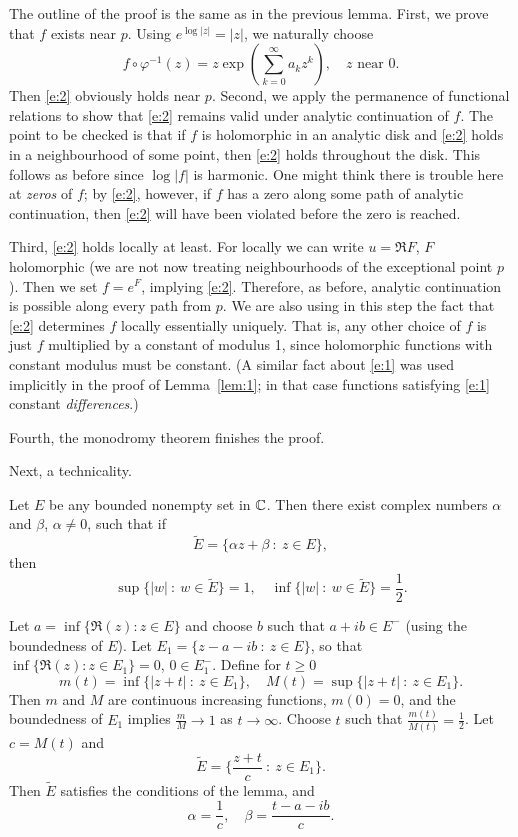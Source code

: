 \documentclass[a4paper,11pt]{article}
\begin{document}
\begin{myproof}
  The outline of the proof is the same as in the previous lemma.
  First, we prove that $f$ exists near $p$.  Using $e^{\log|z|} =
  |z|$, we naturally choose
  $$
  f \circ \varphi^{-1}(z) = z \exp(\sum_{k=0}^{\infty} a_k z^k),
  \quad z\text{ near } 0.
  $$
  Then \eqref{e:2} obviously holds near $p$.  Second, we apply the
  permanence of functional relations to show that \eqref{e:2} remains
  valid under analytic continuation of $f$.  The point to be checked
  is that if $f$ is holomorphic in an analytic disk and \eqref{e:2}
  holds in a neighbourhood of some point, then \eqref{e:2} holds
  throughout the disk.  This follows as before since $\log|f|$ is
  harmonic.  One might think there is trouble here at \emph{zeros} of
  $f$; by \eqref{e:2}, however, if $f$ has a zero along some path of
  analytic continuation, then \eqref{e:2} will have been violated
  before the zero is reached.

  Third, \eqref{e:2} holds locally at least.  For locally we can write
  $u = \Re F$, $F$ holomorphic (we are not now treating neighbourhoods
  of the exceptional point $p$).  Then we set $f = e^F$, implying
  \eqref{e:2}.  Therefore, as before, analytic continuation is
  possible along every path from $p$.  We are also using in this step
  the fact that \eqref{e:2} determines $f$ locally essentially
  uniquely.  That is, any other choice of $f$ is just $f$ multiplied
  by a constant of modulus 1, since holomorphic functions with
  constant modulus must be constant.  (A similar fact about
  \eqref{e:1} was used implicitly in the proof of Lemma~\ref{lem:1};
  in that case functions satisfying \eqref{e:1} constant
  \emph{differences}.)

  Fourth, the monodromy theorem finishes the proof.
\end{myproof}

Next, a technicality.
\begin{lem}
  \label{lem:3}
  Let $E$ be any bounded nonempty set in ${\mathbb C}$.  Then there exist
  complex numbers $\alpha$ and $\beta$, $\alpha \ne 0$, such that if
  $$
  \widetilde{E} = \{\alpha z + \beta ~:~ z \in E\},
  $$
  then
  $$
  \sup \{|w| ~:~ w \in \tilde{E}\} = 1,\quad
  \inf \{|w| ~:~ w \in \tilde{E}\} = \frac{1}{2}.
  $$
\end{lem}

\begin{myproof}
  Let $a = \inf \{ \Re(z) : z \in E\}$ and choose $b$ such that $a +
  ib \in E^-$ (using the boundedness of $E$).  Let $E_1 = \{z - a - ib
  ~:~ z \in E\}$, so that $\inf \{\Re(z) : z \in E_1 \} = 0$, $0 \in
  E_1^-$.  Define for $t \ge 0$
  $$
  m(t) = \inf\{|z+t| ~:~ z \in E_1\},\quad
  M(t) = \sup\{|z+t| ~:~ z \in E_1\}.
  $$
  Then $m$ and $M$ are continuous increasing functions, $m(0) = 0$,
  and the boundedness of $E_1$ implies $\frac{m}{M} \to 1$ as $t \to
  \infty$.  Choose $t$ such that $\frac{m(t)}{M(t)} =
  \frac{1}{2}$. Let $c = M(t)$ and
  $$
  \tilde{E} = \{\frac{z+t}{c} ~:~ z \in E_1\}.
  $$
  Then $\tilde{E}$ satisfies the conditions of the lemma, and
  $$
  \alpha = \frac{1}{c},\quad
  \beta = \frac{t-a-ib}{c}.
  $$
\end{myproof}
\end{document}
